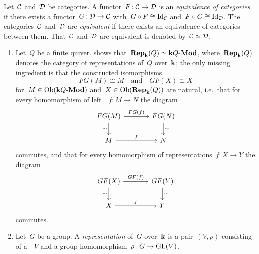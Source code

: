 \begin{definition}
  Let~$\mathcal{C}$ and~$\mathcal{D}$ be categories.
  A functor~$F \colon \mathcal{C} \to \mathcal{D}$ is an \emph{equivalence of categories} if there exists a functor~$G \colon \mathcal{D} \to \mathcal{C}$ with~$G \circ F \cong \mathrm{Id}_{\mathcal{C}}$ and~$F \circ G \cong \mathrm{Id}_{\mathcal{D}}$.
  The categories~$\mathcal{C}$ and~$\mathcal{D}$ are \emph{equivalent} if there exists an equivalence of categories between them.
  That~$\mathcal{C}$ and~$\mathcal{D}$ are equivalent is denoted by~$\mathcal{C} \simeq \mathcal{D}$.
\end{definition}


\begin{example}
  \leavevmode
  \begin{enumerate}
    \item
      Let~$Q$ be a finite quiver.
       shows that~$\mathbf{Rep}_{\mathbf{k}}(Q) \simeq \text{$\mathbf{k} Q$-$\mathbf{Mod}$}$, where~$\mathbf{Rep}_{\mathbf{k}}(Q)$ denotes the category of representations of~$Q$ over~$\kf$;
      the only missing ingredient is that the constructed isomorphisms
      \[
              FG(M)
        \cong M
        \quad\text{and}\quad
              GF(X)
        \cong X
      \]
      for~$M \in \operatorname{Ob}(\text{$\mathbf{k} Q$-$\mathbf{Mod}$})$ and~$X \in \operatorname{Ob}(\mathbf{Rep}_{\mathbf{k}}(Q))$ are natural, i.e.\ that for every homomorphism of left~{}~$f \colon M \to N$ the diagram
      \[
        \begin{tikzcd}[column sep = large]
            FG(M)
            \arrow{r}[above]{FG(f)}
            \arrow{d}[left]{\sim}
          & FG(N)
            \arrow{d}[right]{\sim}
          \\
            M
            \arrow{r}[above]{f}
          & N
        \end{tikzcd}
      \]
      commutes, and that for every homomorphism of representations~$f \colon X \to Y$ the diagram
      \[
        \begin{tikzcd}[column sep = large]
            GF(X)
            \arrow{r}[above]{GF(f)}
            \arrow{d}[left]{\sim}
          & GF(Y)
            \arrow{d}[right]{\sim}
          \\
            X
            \arrow{r}[above]{f}
          & Y
        \end{tikzcd}
      \]
      commutes.
    \item
      Let~$G$ be a group.
      A \emph{representation} of~$G$ over~$\kf$ is a pair~$(V,\rho)$ consisting of a~{\module{$\kf$}}~$V$ and a group homomorphism~$\rho \colon G \to \operatorname{GL}(V)$.

\end{enumerate}
\end{example}

